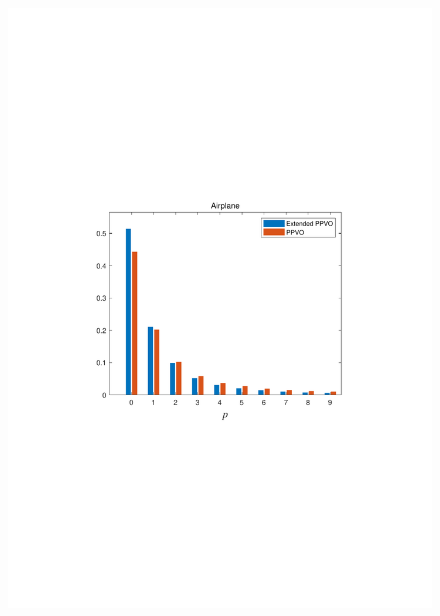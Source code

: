\documentclass[review,3p,10pt,sort&compress]{elsarticle}
\begin{document}
\begin{figure}
{\begin{minipage}[t]{0.225\linewidth}
    \includegraphics[width=1\textwidth]{figures/Comparison/airplane.pdf}
    \end{minipage}
}
\end{figure}
\end{document}
